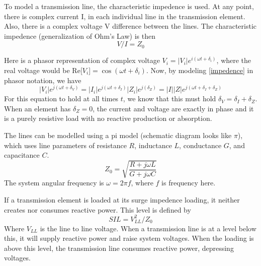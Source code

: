 To model a transmission line, the characteristic impedence is used.  At any point, there is complex current I, in each individual line in the transmission element.  Also, there is a complex voltage V difference between the lines.  The characteristic impedence (generalization of Ohm's Law) is then
\begin{equation} \label{impedence}
V/I = Z_0
\end{equation}

Here is a phasor representation of complex voltage $V_i = | V_i | e^{i (\omega t + \delta_i) }$, where the real voltage would be Re[$V_i$]$=\cos (\omega t + \delta_i)$.  Now, by modeling \ref{impedence} in phasor notation, we have 
\begin{equation}
 | V_i | e^{j (\omega t + \delta_V) } = | I_i | e^{j (\omega t + \delta_I) }  | Z_i | e^{j ( \delta_Z) } = |I||Z|e^{j (\omega t + \delta_I + \delta_Z)}
\end{equation}
For this equation to hold at all times $t$, we know that this must hold $\delta_V = \delta_I + \delta_Z$.  When an element has $\delta_Z = 0$, the current and voltage are exactly in phase and it is a purely resistive load with no reactive production or absorption. 

The lines can be modelled using a pi model (schematic diagram looks like $\pi$), which uses line parameters of resistance $R$, inductance $L$, conductance $G$, and capacitance $C$. 
\begin{equation}
Z_0 = \sqrt{  \frac{R+j \omega L}{G+j\omega C} }
\end{equation}
The system angular frequency is $\omega = 2 \pi f$, where $f$ is frequency here.  

If a transmission element is loaded at its surge impedence loading, it neither creates nor consumes reactive power.  This level is defined by 
\begin{equation}
SIL = V_{LL}^2 / Z_0
\end{equation}
Where $V_{LL}$ is the line to line voltage.  When a transmission line is at a level below this, it will supply reactive power and raise system voltages.  When the loading is above this level, the transmission line consumes reactive power, depressing voltages.

